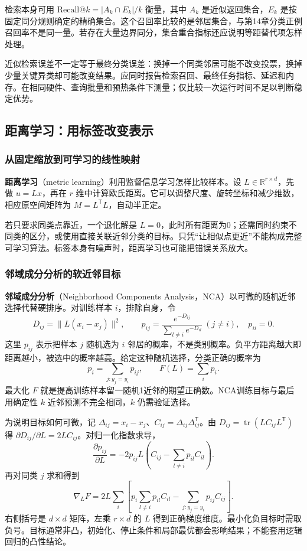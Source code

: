 \documentclass[UTF8,fontset=none,zihao=-4,a4paper]{ctexart}
\newcommand{\term}[1]{\textbf{#1}}
\numberwithin{equation}{section}
\numberwithin{figure}{section}
\begin{document}
检索本身可用 \(\mathrm{Recall@}k=|A_k\cap E_k|/k\) 衡量，其中 $A_k$ 是近似返回集合，$E_k$ 是按固定同分规则确定的精确集合。这个召回率比较的是邻居集合，与第14章分类正例召回率不是同一量。若存在大量边界同分，集合重合指标还应说明等距替代项怎样处理。

近似检索误差不一定等于最终分类误差：换掉一个同类邻居可能不改变投票，换掉少量关键异类却可能改变结果。应同时报告检索召回、最终任务指标、延迟和内存。在相同硬件、查询批量和预热条件下测量；仅比较一次运行时间不足以判断稳定优势。

\subsection{距离学习：用标签改变表示}
\subsubsection{从固定缩放到可学习的线性映射}
\term{距离学习}（metric learning）利用监督信息学习怎样比较样本。设 $L\in\mathbb R^{r\times d}$，先做 $u=Lx$，再在 $r$ 维中计算欧氏距离。它可以调整尺度、旋转坐标和减少维数，相应原空间矩阵为 $M=L^{\mathsf T}L$，自动半正定。

若只要求同类点靠近，一个退化解是 $L=0$，此时所有距离为0；还需同时约束不同类的区分，或使用直接关联近邻分类的目标。只凭“让相似点更近”不能构成完整可学习算法。标签本身有噪声时，距离学习也可能把错误关系放大。

\subsubsection{邻域成分分析的软近邻目标}
\term{邻域成分分析}（Neighborhood Components Analysis，NCA）以可微的随机近邻选择代替硬排序。对训练样本 $i$，排除自身，令
\[
 D_{ij}=\|L(x_i-x_j)\|^2,\qquad
 p_{ij}=\frac{e^{-D_{ij}}}{\sum_{l\ne i}e^{-D_{il}}}\ (j\ne i),\quad p_{ii}=0.
\]
这里 $p_{ij}$ 表示把样本 $j$ 随机选为 $i$ 邻居的概率，不是类别概率。负平方距离越大即距离越小，被选中的概率越高。给定这种随机选择，分类正确的概率为
\[
 p_i=\sum_{j:y_j=y_i}p_{ij},\qquad F(L)=\sum_i p_i.
\]
最大化 $F$ 就是提高训练样本留一随机1近邻的期望正确数。NCA训练目标与最后用确定性 $k$ 近邻预测不完全相同，$k$ 仍需验证选择。

为说明目标如何可微，记 $\Delta_{ij}=x_i-x_j$、$C_{ij}=\Delta_{ij}\Delta_{ij}^{\mathsf T}$。由 $D_{ij}=\operatorname{tr}(LC_{ij}L^{\mathsf T})$ 得 $\partial D_{ij}/\partial L=2LC_{ij}$。对归一化指数求导，
\[
 \frac{\partial p_{ij}}{\partial L}
 =-2p_{ij}L\left(C_{ij}-\sum_{l\ne i}p_{il}C_{il}\right).
\]
再对同类 $j$ 求和得到
\[
 \nabla_LF=2L\sum_i\left[p_i\sum_{l\ne i}p_{il}C_{il}
 -\sum_{j:y_j=y_i}p_{ij}C_{ij}\right].
\]
右侧括号是 $d\times d$ 矩阵，左乘 $r\times d$ 的 $L$ 得到正确梯度维度。最小化负目标时需取负号。目标通常非凸，初始化、停止条件和局部最优都会影响结果；不能套用逻辑回归的凸性结论。
\end{document}
